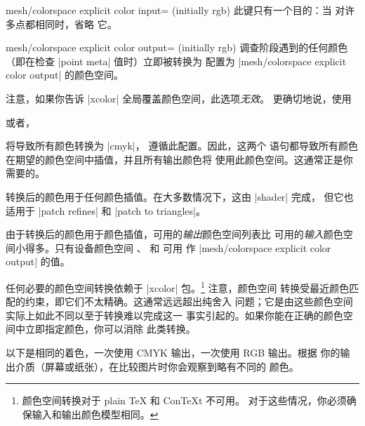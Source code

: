 {{\begin{pgfplotskey}{mesh/colorspace explicit color input=\allowbreak{} (initially rgb)%
}
    此键只有一个目的：当  对许多点都相同时，省略
    它。
\end{pgfplotskey}

\begin{pgfplotskey}{%
    mesh/colorspace explicit color output= (initially rgb)%
}
    调查阶段遇到的任何颜色（即在检查 |point meta| 值时）立即被转换为
    配置为 |mesh/colorspace explicit color output| 的颜色空间。

    注意，如果你告诉 |xcolor| 全局覆盖颜色空间，此选项\emph{无效}。
    更确切地说，使用
\begin{codeexample}
\usepackage[cmyk]{xcolor}
\end{codeexample}
    或者，
\begin{codeexample}
\end{codeexample}
    将导致所有颜色转换为 |cmyk|，\PGFPlots{} 遵循此配置。因此，这两个
    语句都导致所有颜色在期望的颜色空间中插值，并且所有输出颜色将
    使用此颜色空间。这通常正是你需要的。

    转换后的颜色用于任何颜色插值。在大多数情况下，这由 |shader| 完成，
    但它也适用于 |patch refines| 和 |patch to triangles|。

    由于转换后的颜色用于颜色插值，可用的\emph{输出}颜色空间列表比
    可用的\emph{输入}颜色空间小得多。只有设备颜色空间
    、 和  可用
    作 |mesh/colorspace explicit color output| 的值。

    任何必要的颜色空间转换依赖于 |xcolor|
    包。\footnote{颜色空间转换对于 plain \TeX{} 和 Con\TeX{}t 不可用。
    对于这些情况，你必须确保输入和输出颜色模型相同。} 注意，颜色空间
    转换受最近颜色匹配的约束，即它们不太精确。这通常远远超出纯舍入
    问题；它是由这些颜色空间实际上如此不同以至于转换难以完成这一
    事实引起的。如果你能在正确的颜色空间中立即指定颜色，你可以消除
    此类转换。

    以下是相同的着色，一次使用 CMYK 输出，一次使用 RGB 输出。根据
    你的输出介质（屏幕或纸张），在比较图片时你会观察到略有不同的
    颜色。
\begin{codeexample}[]
\end{codeexample}


\end{pgfplotskey}}}
